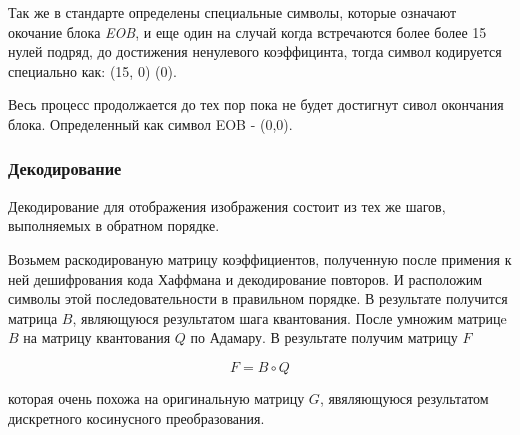 \documentclass{matmex-diploma-custom}
\begin{document}
Так же в стандарте определены специальные символы, которые означают окочание блока \emph{EOB}, и еще один на случай когда встречаются более более 15 нулей подряд, до достижения ненулевого коэффицинта, тогда символ кодируется специально как: (15, 0) (0).

 Весь процесс продолжается до тех пор пока не будет достигнут сивол окончания блока. Определенный как символ  EOB - (0,0).\\



\subsubsection{Декодирование}

Декодирование для отображения изображения состоит из тех же шагов, выполняемых в обратном порядке.


Возьмем раскодированую матрицу коэффициентов, полученную после примения к ней дешифрования кода Хаффмана и декодирование повторов. И расположим символы этой последовательности в правильном порядке. В результате получится матрица $B$, являющуюся результатом шага квантования.
После умножим матрицe $B$  на матрицу квантования $Q$ по Адамару. В результате получим матрицу $F$

$$ F = B \circ Q $$

которая очень похожа на оригинальную  матрицу $G$, явяляющуюся результатом дискретного косинусного преобразования.

\end{document}
